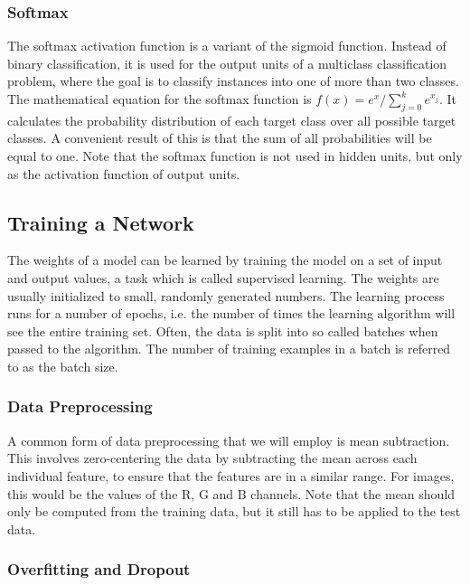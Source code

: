 \subsubsection{Softmax}

The softmax activation function is a variant of the sigmoid function. Instead of binary classification, it is used for the output units of a multiclass classification problem, where the goal is to classify instances into one of more than two classes. The mathematical equation for the softmax function is $f(x) = e^x/\sum_{j=0}^k e^{x_j}$. It calculates the probability distribution of each target class over all possible target classes. A convenient result of this is that the sum of all probabilities will be equal to one. Note that the softmax function is not used in hidden units, but only as the activation function of output units.

\subsection{Training a Network} \label{training-sec}

The weights of a model can be learned by training the model on a set of input and output values, a task which is called supervised learning. The weights are usually initialized to small, randomly generated numbers. The learning process runs for a number of epochs, i.e. the number of times the learning algorithm will see the entire training set. Often, the data is split into so called batches when passed to the algorithm. The number of training examples in a batch is referred to as the batch size.

\subsubsection{Data Preprocessing} %

A common form of data preprocessing that we will employ is mean subtraction. This involves zero-centering the data by subtracting the mean across each individual feature, to ensure that the features are in a similar range. For images, this would be the values of the R, G and B channels. Note that the mean should only be computed from the training data, but it still has to be applied to the test data.

\subsubsection{Overfitting and Dropout}

